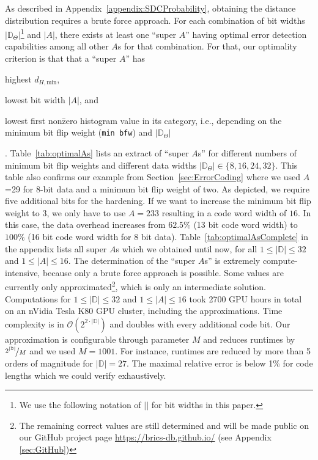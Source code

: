 As described in Appendix~\ref{appendix:SDCProbability}, obtaining the distance distribution requires a brute force approach. For each combination of bit widths \(|\mathbb{D}_\Theta|\)\footnote{We use the following notation of \(||\) for bit widths in this paper.} and \(|A|\), there exists at least one ``super \(A\)'' having optimal error detection capabilities among all other \(A\)s for that combination. For that, our optimality criterion is that that a ``super \(A\)'' has \begin{inparaenum}[(1)] \item highest \(d_{H,\text{min}}\), \item lowest bit width \(|A|\), and  \item lowest first non\=zero histogram value in its category, i.e., depending on the minimum bit flip weight (\texttt{min bfw}) and \(|\mathbb{D}_\Theta|\)\end{inparaenum}. Table~\ref{tab:optimalAs} lists an extract of ``super \(A\)s'' for different numbers of minimum bit flip weights and different data widths \(|\mathbb{D}_\Theta|\in\{8,16,24,32\}\). This table also confirms our example from Section~\ref{sec:ErrorCoding} where we used \(A\)=29 for $8$-bit data and a minimum bit flip weight of two. As depicted, we require five additional bits for the hardening. If we want to increase the minimum bit flip weight to $3$, we only have to use \(A=233\) resulting in a code word width of $16$.  In this case, the data overhead increases from $62.5\%$ (13 bit code word width) to $100\%$ (16 bit code word width for 8 bit data). Table~\ref{tab:optimalAsComplete} in the appendix lists all super \(A\)s which we obtained until now, for all \(1\leq|\mathbb{D}|\leq32\) and \(1\leq|A|\leq16\). The determination of the ``super \(A\)s'' is extremely compute-intensive, because only a brute force approach is possible. Some values are currently only approximated\footnote{The remaining correct values are still determined and will be made public on our GitHub project page \url{https://brics-db.github.io/} (see Appendix \ref{sec:GitHub})}, which is only an intermediate solution. Computations for \(1\leq|\mathbb{D}|\leq32\) and \(1\leq|A|\leq16\) took 2700 GPU hours in total on an nVidia Tesla K80 GPU cluster, including the approximations. Time complexity is in \(\mathcal{O}(2^{2\cdot|\mathbb{D}|})\) and doubles with every additional code bit. Our approximation is configurable through parameter \(M\) and reduces runtimes by \(\nicefrac{2^{|\mathbb{D}|}}{M}\) and we used \(M=1001\). For instance, runtimes are reduced by more than 5 orders of magnitude for \(|\mathbb{D}|=27\). The maximal relative error is below 1\% for code lengths which we could verify exhaustively.

